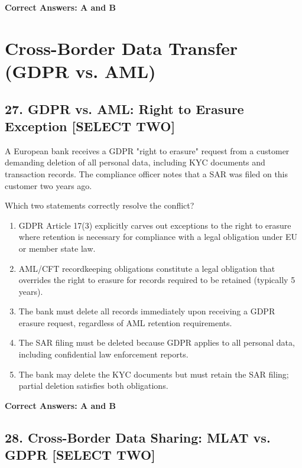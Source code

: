 \documentclass[11pt,a4paper]{article}
\begin{document}
	\textbf{Correct Answers: A and B}
	
	\section{Cross-Border Data Transfer (GDPR vs. AML)}
	
	\subsection{27. GDPR vs. AML: Right to Erasure Exception \textnormal{[SELECT TWO]}}
	
	A European bank receives a GDPR "right to erasure" request from a customer demanding deletion of all personal data, including KYC documents and transaction records. The compliance officer notes that a SAR was filed on this customer two years ago.
	
	Which two statements correctly resolve the conflict?
	
	\begin{enumerate}[label=\Alph*.]
		\item GDPR Article 17(3) explicitly carves out exceptions to the right to erasure where retention is necessary for compliance with a legal obligation under EU or member state law.
		\item AML/CFT recordkeeping obligations constitute a legal obligation that overrides the right to erasure for records required to be retained (typically 5 years).
		\item The bank must delete all records immediately upon receiving a GDPR erasure request, regardless of AML retention requirements.
		\item The SAR filing must be deleted because GDPR applies to all personal data, including confidential law enforcement reports.
		\item The bank may delete the KYC documents but must retain the SAR filing; partial deletion satisfies both obligations.
	\end{enumerate}
	
	\textbf{Correct Answers: A and B}
	
	\subsection{28. Cross-Border Data Sharing: MLAT vs. GDPR \textnormal{[SELECT TWO]}}
	
\end{document}
